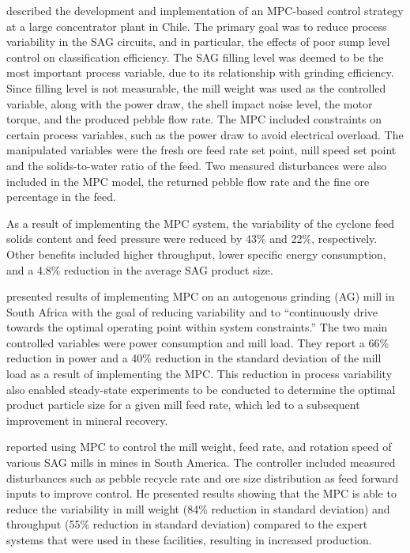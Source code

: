 \cite{yutronic_sag_2011} described the development and implementation of an \gls{MPC}-based control strategy at a large concentrator plant in Chile. The primary goal was to reduce process variability in the \acrshort{SAG} circuits, and in particular, the effects of poor sump level control on classification efficiency. The \acrshort{SAG} filling level was deemed to be the most important process variable, due to its relationship with grinding efficiency. Since filling level is not measurable, the mill weight was used as the controlled variable, along with the power draw, the shell impact noise level, the motor torque, and the produced pebble flow rate. The \gls{MPC} included constraints on certain process variables, such as the power draw to avoid electrical overload. The manipulated variables were the fresh ore feed rate set point, mill speed set point and the solids-to-water ratio of the feed. Two measured disturbances were also included in the \gls{MPC} model, the returned pebble flow rate and the fine ore percentage in the feed.

As a result of implementing the \gls{MPC} system, the variability of the cyclone feed solids content and feed pressure were reduced by 43\% and 22\%, respectively. Other benefits included higher throughput, lower specific energy consumption, and a 4.8\% reduction in the average \acrshort{SAG} product size.

\cite{steyn_benefits_2013} presented results of implementing \gls{MPC} on an autogenous grinding (\gls{AG}) mill in South Africa with the goal of reducing variability and to ``continuously drive towards the optimal operating point within system constraints.'' The two main controlled variables were power consumption and mill load. They report a 66\% reduction in power and a 40\% reduction in the standard deviation of the mill load as a result of implementing the \gls{MPC}. This reduction in process variability also enabled steady-state experiments to be conducted to determine the optimal product particle size for a given mill feed rate, which led to a subsequent improvement in mineral recovery.

\cite{gough_sag_2015} reported using \gls{MPC} to control the mill weight, feed rate, and rotation speed of various \acrshort{SAG} mills in mines in South America. The controller included measured disturbances such as pebble recycle rate and ore size distribution as feed forward inputs to improve control. He presented results showing that the \gls{MPC} is able to reduce the variability in mill weight (84\% reduction in standard deviation) and throughput (55\% reduction in standard deviation) compared to the expert systems that were used in these facilities, resulting in increased production.

